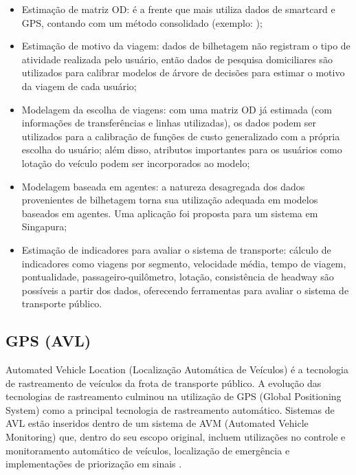 \documentclass[        
    a4paper,          %
    12pt,             %
    chapter=TITLE,    %
    section=Title,    %
    subsection=Title, %
    oneside,          %
    english,          %
    spanish,          %
    brazil,           %
    fleqn             %
]{abntex2}
\begin{document}
  \begin{itemize}
  \tightlist
  \item
    Estimação de matriz OD: é a frente que mais utiliza dados de smartcard e GPS, contando com um método consolidado (exemplo: \citet{Munizaga2012});
  \item
    Estimação de motivo da viagem: dados de bilhetagem não registram o tipo de atividade realizada pelo usuário, então dados de pesquisa domiciliares são utilizados para calibrar modelos de árvore de decisões para estimar o motivo da viagem de cada usuário;
  \item
    Modelagem da escolha de viagens: com uma matriz OD já estimada (com informações de transferências e linhas utilizadas), os dados podem ser utilizados para a calibração de funções de custo generalizado com a própria escolha do usuário; além disso, atributos importantes para os usuários como lotação do veículo podem ser incorporados ao modelo;
  \item
    Modelagem baseada em agentes: a natureza desagregada dos dados provenientes de bilhetagem torna sua utilização adequada em modelos baseados em agentes. Uma aplicação foi proposta para um sistema em Singapura;
  \item
    Estimação de indicadores para avaliar o sistema de transporte: cálculo de indicadores como viagens por segmento, velocidade média, tempo de viagem, pontualidade, passageiro-quilômetro, lotação, consistência de headway são possíveis a partir dos dados, oferecendo ferramentas para avaliar o sistema de transporte público.
  \end{itemize}
  
  \hypertarget{gps-avl}{%
  \subsection{GPS (AVL)}\label{gps-avl}}
  
  Automated Vehicle Location (Localização Automática de Veículos) é a tecnologia de rastreamento de veículos da frota de transporte público. A evolução das tecnologias de rastreamento culminou na utilização de GPS (Global Positioning System) como a principal tecnologia de rastreamento automático. Sistemas de AVL estão inseridos dentro de um sistema de AVM (Automated Vehicle Monitoring) que, dentro do seu escopo original, incluem utilizações no controle e monitoramento automático de veículos, localização de emergência e implementações de priorização em sinais \citep{Townes1997}.
  
\end{document}
